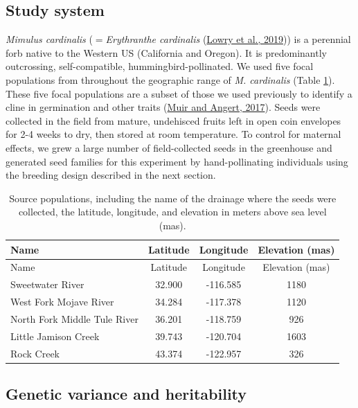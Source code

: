 \documentclass[
  12pt,
]{article}
\begin{document}
\hypertarget{study-system}{%
\subsection{Study system}\label{study-system}}

\emph{Mimulus cardinalis} (\(=\)\emph{Erythranthe cardinalis} (\protect\hyperlink{ref-lowry_case_2019}{Lowry et al., 2019})) is a perennial forb native to the Western US (California and Oregon). It is predominantly outcrossing, self-compatible, hummingbird-pollinated. We used five focal populations from throughout the geographic range of \emph{M. cardinalis} (Table \ref{tab:focal_pops}). These five focal populations are a subset of those we used previously to identify a cline in germination and other traits (\protect\hyperlink{ref-muir_grow_2017}{Muir and Angert, 2017}). Seeds were collected in the field from mature, undehisced fruits left in open coin envelopes for 2-4 weeks to dry, then stored at room temperature. To control for maternal effects, we grew a large number of field-collected seeds in the greenhouse and generated seed families for this experiment by hand-pollinating individuals using the breeding design described in the next section.

\begin{longtable}[]{@{}lccc@{}}
\caption{\label{tab:focal_pops} Source populations, including the name of the drainage where the seeds were collected, the latitude, longitude, and elevation in meters above sea level (mas).}\tabularnewline
\toprule
Name & Latitude & Longitude & Elevation (mas) \\
\midrule
\endfirsthead
\toprule
Name & Latitude & Longitude & Elevation (mas) \\
\midrule
\endhead
Sweetwater River & 32.900 & -116.585 & 1180 \\
West Fork Mojave River & 34.284 & -117.378 & 1120 \\
North Fork Middle Tule River & 36.201 & -118.759 & 926 \\
Little Jamison Creek & 39.743 & -120.704 & 1603 \\
Rock Creek & 43.374 & -122.957 & 326 \\
\bottomrule
\end{longtable}

\hypertarget{genetic-variance-and-heritability}{%
\subsection{Genetic variance and heritability}\label{genetic-variance-and-heritability}}
\end{document}
